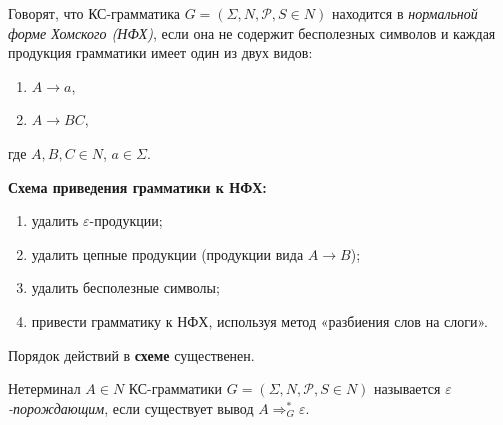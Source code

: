 \begin{Def}[Хомский, 1959]
Говорят, что КС-грамматика $G=(\Sigma, N, \mathcal P, S \in N)$ находится в
\emph{нормальной форме Хомского (НФХ)}, если она не содержит бесполезных символов
и каждая продукция грамматики имеет один из двух видов:
\begin{enumerate}
\renewcommand{\labelenumi}{\theenumi)}
  \item $A \to a$,
  \item $A \to BC$, 
\end{enumerate}
где $A,B,C \in N$, $a \in \Sigma$.
\end{Def}
\pagebreak

\textbf{Схема приведения грамматики к НФХ:}
\begin{enumerate}
  \item удалить $\varepsilon$-продукции;
  \item удалить цепные продукции (продукции вида $A \to B$);
  \item удалить бесполезные символы;
  \item привести грамматику к НФХ, используя метод «разбиения слов на слоги».
\end{enumerate}

\begin{Remark}
Порядок действий в \textbf{схеме} существенен.
\end{Remark}

\begin{Def}
Нетерминал $A \in N$ КС-грамматики $G=(\Sigma, N, \mathcal P, S \in N)$
называется \emph{$\varepsilon$-порождающим}, если существует вывод
$A \Rightarrow^{\ast}_G \varepsilon$. 
\end{Def}

